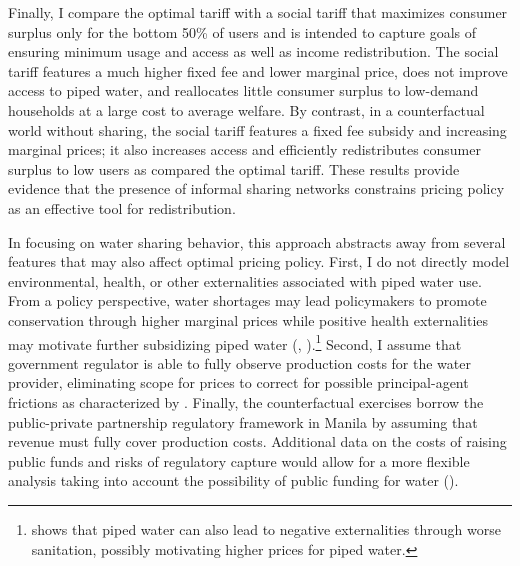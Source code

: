 \documentclass[12pt]{article}
\begin{document}
Finally, I compare the optimal tariff with a social tariff that maximizes consumer surplus only for the bottom 50\% of users and is intended to capture goals of ensuring minimum usage and access as well as income redistribution.  The social tariff features a much higher fixed fee and lower marginal price, does not improve access to piped water, and reallocates little consumer surplus to low-demand households at a large cost to average welfare.  By contrast, in a counterfactual world without sharing, the social tariff features a fixed fee subsidy and increasing marginal prices; it also increases access and efficiently redistributes consumer surplus to low users as compared the optimal tariff.  These results provide evidence that the presence of informal sharing networks constrains pricing policy as an effective tool for redistribution.

In focusing on water sharing behavior, this approach abstracts away from several features that may also affect optimal pricing policy.  First, I do not directly model environmental, health, or other externalities associated with piped water use.  From a policy perspective, water shortages may lead policymakers to promote conservation through higher marginal prices while positive health externalities may motivate further subsidizing piped water (\cite{timmins2002measuring}, \cite{galiani2005water}).\footnote{\cite{bennett2012does} shows that piped water can also lead to negative externalities through worse sanitation, possibly motivating higher prices for piped water.}  Second, I assume that government regulator is able to fully observe production costs for the water provider, eliminating scope for prices to correct for possible principal-agent frictions as characterized by \cite{laffont1993theory}.  Finally, the counterfactual exercises borrow the public-private partnership regulatory framework in Manila by assuming that revenue must fully cover production costs.  Additional data on the costs of raising public funds and risks of regulatory capture would allow for a more flexible analysis taking into account the possibility of public funding for water (\cite{laffont2005regulation}).  

\end{document}
